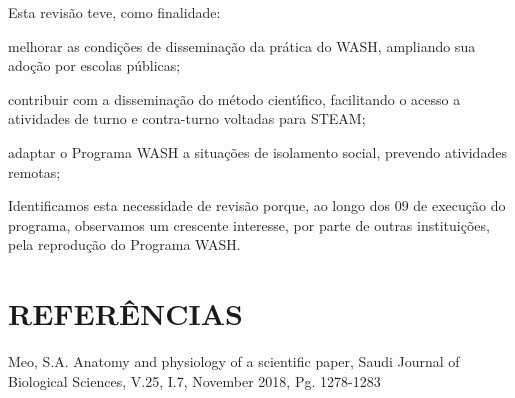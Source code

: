 \documentclass[
12pt,		%
openright,	%
twoside,  %
a4paper,			%
chapter=TITLE,		%
english,			%
french,				%
spanish,			%
brazil				%
]{USPSC-classe/USPSC}
\begin{document}
Esta revis\~ao teve, como finalidade:











\begin{alineas}
\item melhorar as condi\c{c}\~oes de dissemina\c{c}\~ao da pr\'atica do WASH, ampliando sua ado\c{c}\~ao por escolas p\'ublicas;
\item contribuir com a dissemina\c{c}\~ao do m\'etodo cient\'{\i}fico, facilitando o acesso a atividades de turno e contra-turno voltadas para STEAM;
\item adaptar o Programa WASH a situa\c{c}\~oes de isolamento social, prevendo atividades remotas;
\end{alineas}

Identificamos esta necessidade de revis\~ao porque, ao longo dos 09 de execu\c{c}\~ao do programa, observamos um crescente interesse, por parte de outras institui\c{c}\~oes, pela reprodu\c{c}\~ao do Programa WASH.










\chapter[REFER\^ENCIAS]{REFER\^ENCIAS}\label{REFER\^ENCIAS}
\begin{flushleft}
\begin{flushleft}
\begin{flushleft}
\begin{flushleft}
\begin{flushleft}
\begin{flushleft}
\begin{flushleft}
\begin{flushleft}
\begin{flushleft}
\begin{flushleft}
[MEO, 2018] Meo, S.A. Anatomy and physiology of a scientific paper, Saudi Journal of Biological Sciences, V.25, I.7, November 2018, Pg. 1278-1283
\end{flushleft}


\end{flushleft}


\end{flushleft}


\end{flushleft}


\end{flushleft}


\end{flushleft}


\end{flushleft}


\end{flushleft}


\end{flushleft}


\end{flushleft}
\end{document}
